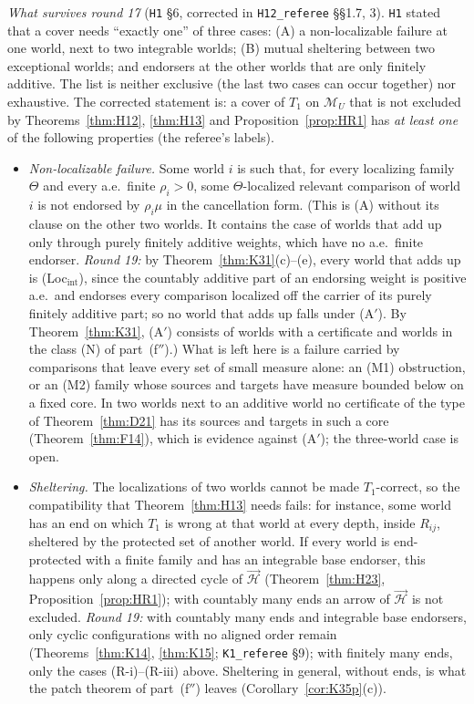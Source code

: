\documentclass[11pt]{article}
\theoremstyle{definition}
\theoremstyle{remark}
\newcommand{\M}{\mathcal M}
\newcommand{\src}[1]{\texttt{#1}}
\begin{document}
\emph{What survives round 17} (\src{H1} \S6, corrected in \src{H12\_referee} \S\S1.7, 3). \src{H1} stated that a cover needs ``exactly one'' of three cases: (A) a non-localizable failure at one world, next to two integrable worlds; (B) mutual sheltering between two exceptional worlds; and endorsers at the other worlds that are only finitely additive. The list is neither exclusive (the last two cases can occur together) nor exhaustive. The corrected statement is: a cover of $T_1$ on $\M_U$ that is not excluded by Theorems~\ref{thm:H12}, \ref{thm:H13} and Proposition~\ref{prop:HR1} has \emph{at least one} of the following properties (the referee's labels).
\begin{itemize}[leftmargin=*]
\item[\textbf{(A$'$)}] \emph{Non-localizable failure.} Some world $i$ is such that, for every localizing family $\Theta$ and every a.e.\ finite $\rho_i>0$, some $\Theta$-localized relevant comparison of world $i$ is not endorsed by $\rho_i\mu$ in the cancellation form. (This is (A) without its clause on the other two worlds. It contains the case of worlds that add up only through purely finitely additive weights, which have no a.e.\ finite endorser. \emph{Round 19:} by Theorem~\ref{thm:K31}(c)--(e), every world that adds up is (Loc$_{\mathrm{int}}$), since the countably additive part of an endorsing weight is positive a.e.\ and endorses every comparison localized off the carrier of its purely finitely additive part; so no world that adds up falls under (A$'$). By Theorem~\ref{thm:K31}, (A$'$) consists of worlds with a certificate and worlds in the class (N) of part~(f$''$).) What is left here is a failure carried by comparisons that leave every set of small measure alone: an (M1) obstruction, or an (M2) family whose sources and targets have measure bounded below on a fixed core. In two worlds next to an additive world no certificate of the type of Theorem~\ref{thm:D21} has its sources and targets in such a core (Theorem~\ref{thm:F14}), which is evidence against (A$'$); the three-world case is open.
\item[\textbf{(B)}] \emph{Sheltering.} The localizations of two worlds cannot be made $T_1$-correct, so the compatibility that Theorem~\ref{thm:H13} needs fails: for instance, some world has an end on which $T_1$ is wrong at that world at every depth, inside $R_{ij}$, sheltered by the protected set of another world. If every world is end-protected with a finite family and has an integrable base endorser, this happens only along a directed cycle of $\vec{\mathcal H}$ (Theorem~\ref{thm:H23}, Proposition~\ref{prop:HR1}); with countably many ends an arrow of $\vec{\mathcal H}$ is not excluded. \emph{Round 19:} with countably many ends and integrable base endorsers, only cyclic configurations with no aligned order remain (Theorems~\ref{thm:K14}, \ref{thm:K15}; \src{K1\_referee} \S9); with finitely many ends, only the cases (R-i)--(R-iii) above. Sheltering in general, without ends, is what the patch theorem of part~(f$''$) leaves (Corollary~\ref{cor:K35p}(c)).

\end{itemize}
\end{document}
